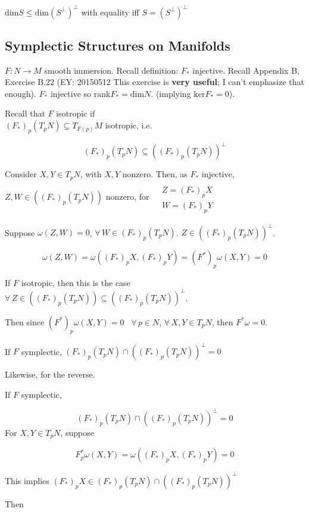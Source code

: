$\text{dim}S \leq \text{dim} (S^{\perp})^{\perp}$ with equality iff $S= (S^{\perp})^{\perp}$




\subsection{Symplectic Structures on Manifolds}

 $F:N\to M$ smooth immersion.  Recall definition: $F_*$ injective.  Recall Appendix B, Exercise B.22 (EY: 20150512 This exercise is \textbf{very useful}; I can't emphasize that enough).  $F_*$ injective so $\text{rank}F_* = \text{dim}N$. (implying $\text{ker}F_*=0$).  

Recall that $F$ isotropic if \\

$(F_*)_p(T_pN) \subseteq T_{F(p)}M$ isotropic, i.e. 

\[
(F_*)_p(T_pN) \subseteq ((F_*)_p(T_pN))^{\perp}
\]

Consider $X,Y \in T_pN$, with $X,Y$ nonzero.  Then, as $F_*$ injective, $Z,W \in ((F_*)_p(T_pN))$ nonzero, for $\begin{aligned}
& \quad \\
  & Z = (F_*)_pX \\
  & W = (F_*)_pY \end{aligned}$

Suppose $\omega(Z,W)=0$, $\forall \, W \in (F_*)_p(T_pN)$.  $Z \in ((F_*)_p(T_pN))^{\perp}$.  

\[
\omega(Z,W) = \omega((F_*)_pX, (F_*)_pY) = (F^*)_p\omega(X,Y)=0
\]

If $F$ isotropic, then this is the case $\forall \, Z \in ((F_*)_p(T_pN)) \subseteq ((F_*)_p(T_pN))^{\perp}$.  

Then since $(F^*)_p\omega(X,Y)=0$ \, $\forall \, p \in N$, $\forall \, X,Y \in T_pN$, then $F^*\omega=0$.  

If $F$ symplectic, $(F_*)_p(T_pN) \cap ((F_*)_p(T_pN))^{\perp}=0$

Likewise, for the reverse.  

If $F$ symplectic, 

\[
(F_*)_p(T_pN) \cap ((F_*)_p(T_pN))^{\perp}=0
\]
For $ X,Y \in T_pN$, suppose

\[
F_p^*\omega(X,Y) = \omega((F_*)_pX, (F_*)_pY) =0 
\]

This implies $(F_*)_pX \in (F_*)_p(T_pN) \cap ((F_*)_p(T_pN))^{\perp}$

Then 

